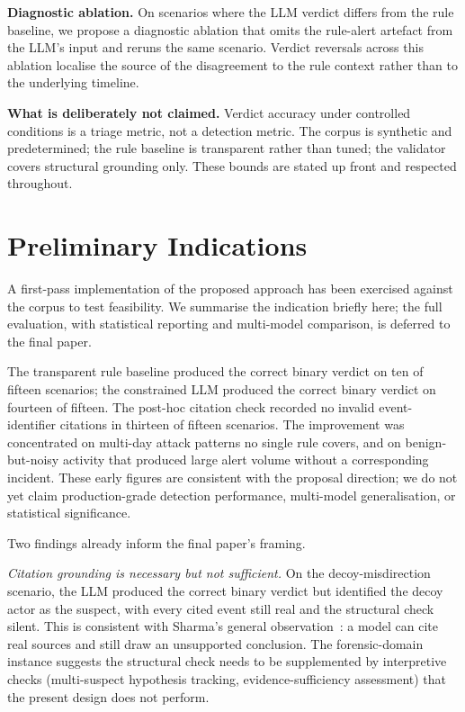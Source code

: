\documentclass[conference]{IEEEtran}
\begin{document}
\textbf{Diagnostic ablation.} On scenarios where the LLM verdict differs from the rule baseline, we propose a diagnostic ablation that omits the rule-alert artefact from the LLM's input and reruns the same scenario. Verdict reversals across this ablation localise the source of the disagreement to the rule context rather than to the underlying timeline.

\textbf{What is deliberately not claimed.} Verdict accuracy under controlled conditions is a triage metric, not a detection metric. The corpus is synthetic and predetermined; the rule baseline is transparent rather than tuned; the validator covers structural grounding only. These bounds are stated up front and respected throughout.

\section{Preliminary Indications}
\label{sec:prelim}

A first-pass implementation of the proposed approach has been exercised against the corpus to test feasibility. We summarise the indication briefly here; the full evaluation, with statistical reporting and multi-model comparison, is deferred to the final paper.

The transparent rule baseline produced the correct binary verdict on ten of fifteen scenarios; the constrained LLM produced the correct binary verdict on fourteen of fifteen. The post-hoc citation check recorded no invalid event-identifier citations in thirteen of fifteen scenarios. The improvement was concentrated on multi-day attack patterns no single rule covers, and on benign-but-noisy activity that produced large alert volume without a corresponding incident. These early figures are consistent with the proposal direction; we do not yet claim production-grade detection performance, multi-model generalisation, or statistical significance.

Two findings already inform the final paper's framing.

\textit{Citation grounding is necessary but not sufficient.} On the decoy-misdirection scenario, the LLM produced the correct binary verdict but identified the decoy actor as the suspect, with every cited event still real and the structural check silent. This is consistent with Sharma's general observation~\cite{ref11}: a model can cite real sources and still draw an unsupported conclusion. The forensic-domain instance suggests the structural check needs to be supplemented by interpretive checks (multi-suspect hypothesis tracking, evidence-sufficiency assessment) that the present design does not perform.
\end{document}
